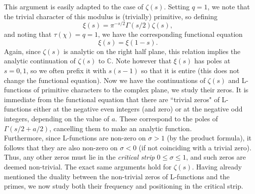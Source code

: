 This argument is easily adapted to the case of $\zeta(s)$. Setting $q = 1$, we note that the trivial character of this modulus is (trivially) primitive, so defining
\begin{equation}
    \xi(s) = \pi^{-s/2}\Gamma(s/2)\zeta(s), \nonumber
\end{equation}
and noting that $\tau(\chi) = q = 1$, we have the corresponding functional equation
\begin{equation}
    \xi(s) = \xi(1-s). \nonumber
\end{equation}
Again, since $\zeta(s)$ is analytic on the right half plane, this relation implies the analytic continuation of $\zeta(s)$ to $\mathbb{C}$. Note however that $\xi(s)$ has poles at $s = 0, 1$, so we often prefix it with $s(s-1)$ so that it is entire (this does not change the functional equation). Now we have the continuations of $\zeta(s)$ and L-functions of primitive characters to the complex plane, we study their zeros. It is immediate from the functional equation that there are ``trivial zeros" of L-functions either at the negative even integers (and zero) or at the negative odd integers, depending on the value of $a$. These correspond to the poles of $\Gamma(s/2 + a/2)$, cancelling them to make an analytic function. \\

Furthermore, since L-functions are non-zero on $\sigma > 1$ (by the product formula), it follows that they are also non-zero on $\sigma < 0$ (if not coinciding with a trivial zero). Thus, any other zeros must lie in the \textit{critical strip} $0 \leq \sigma \leq 1$, and such zeros are deemed non-trivial. The exact same arguments hold for $\zeta(s)$. Having already mentioned the duality between the non-trivial zeros of L-functions and the primes, we now study both their frequency and positioning in the critical strip.